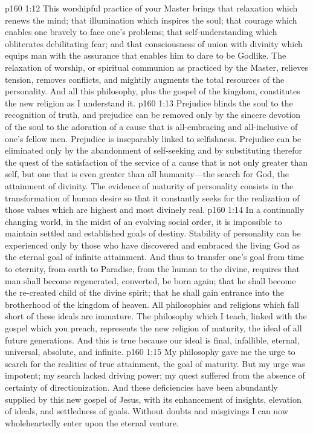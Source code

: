 \vs p160 1:12 This worshipful practice of your Master brings that relaxation which renews the mind; that illumination which inspires the soul; that courage which enables one bravely to face one’s problems; that self\hyp{}understanding which obliterates debilitating fear; and that consciousness of union with divinity which equips man with the assurance that enables him to dare to be Godlike. The relaxation of worship, or spiritual communion as practiced by the Master, relieves tension, removes conflicts, and mightily augments the total resources of the personality. And all this philosophy, plus the gospel of the kingdom, constitutes the new religion as I understand it.
\pc \vs p160 1:13 Prejudice blinds the soul to the recognition of truth, and prejudice can be removed only by the sincere devotion of the soul to the adoration of a cause that is all\hyp{}embracing and all\hyp{}inclusive of one’s fellow men. Prejudice is inseparably linked to selfishness. Prejudice can be eliminated only by the abandonment of self\hyp{}seeking and by substituting therefor the quest of the satisfaction of the service of a cause that is not only greater than self, but one that is even greater than all humanity---the search for God, the attainment of divinity. The evidence of maturity of personality consists in the transformation of human desire so that it constantly seeks for the realization of those values which are highest and most divinely real.
\vs p160 1:14 In a continually changing world, in the midst of an evolving social order, it is impossible to maintain settled and established goals of destiny. Stability of personality can be experienced only by those who have discovered and embraced the living God as the eternal goal of infinite attainment. And thus to transfer one’s goal from time to eternity, from earth to Paradise, from the human to the divine, requires that man shall become regenerated, converted, be born again; that he shall become the re\hyp{}created child of the divine spirit; that he shall gain entrance into the brotherhood of the kingdom of heaven. All philosophies and religions which fall short of these ideals are immature. The philosophy which I teach, linked with the gospel which you preach, represents the new religion of maturity, the ideal of all future generations. And this is true because our ideal is final, infallible, eternal, universal, absolute, and infinite.\plusone
\vs p160 1:15 My philosophy gave me the urge to search for the realities of true attainment, the goal of maturity. But my urge was impotent; my search lacked driving power; my quest suffered from the absence of certainty of directionization. And these deficiencies have been abundantly supplied by this new gospel of Jesus, with its enhancement of insights, elevation of ideals, and settledness of goals. Without doubts and misgivings I can now wholeheartedly enter upon the eternal venture.
